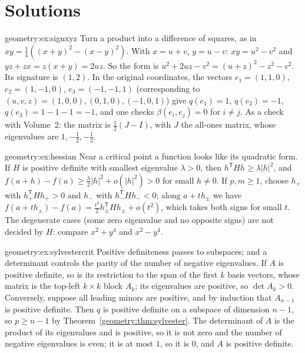 \section{Solutions}

\begin{solution}{geometry:ex:signxyz}
\idea Turn a product into a difference of squares, as in $xy=\frac14((x+y)^2-(x-y)^2)$.
\writeup With $x=u+v$, $y=u-v$: $xy=u^2-v^2$ and $yz+zx=z(x+y)=2uz$. So the form is $u^2+2uz-v^2=(u+z)^2-z^2-v^2$. Its signature is $(1,2)$. In the
original coordinates, the vectors $e_1=(1,1,0)$, $e_2=(1,-1,0)$, $e_3=(-1,-1,1)$ (corresponding to $(u,v,z)=(1,0,0),(0,1,0),(-1,0,1)$) give
$q(e_1)=1$, $q(e_2)=-1$, $q(e_3)=1-1-1=-1$, and one checks $\beta(e_i,e_j)=0$ for $i\ne j$. As a check with Volume~2: the matrix is
$\frac12(J-I)$, with $J$ the all-ones matrix, whose eigenvalues are $1,-\frac12,-\frac12$.
\end{solution}

\begin{solution}{geometry:ex:hessian}
\idea Near a critical point a function looks like its quadratic form.
\writeup If $H$ is positive definite with smallest eigenvalue $\lambda>0$, then $h^{\mathsf T}Hh\ge\lambda|h|^2$, and
$f(a+h)-f(a)\ge\frac\lambda2|h|^2+o(|h|^2)>0$ for small $h\ne0$. If $p,m\ge1$, choose $h_+$ with $h_+^{\mathsf T}Hh_+>0$ and $h_-$ with
$h_-^{\mathsf T}Hh_-<0$; along $a+th_\pm$ we have $f(a+th_\pm)-f(a)=\frac{t^2}2h_\pm^{\mathsf T}Hh_\pm+o(t^2)$, which takes both signs for small $t$.
The degenerate cases (some zero eigenvalue and no opposite signs) are not decided by $H$: compare $x^2+y^4$ and $x^2-y^4$.
\end{solution}

\begin{solution}{geometry:ex:sylvestercrit}
\idea Positive definiteness passes to subspaces; and a determinant controls the parity of the number of negative eigenvalues.
\writeup If $A$ is positive definite, so is its restriction to the span of the first $k$ basis vectors, whose matrix is the top-left $k\times k$
block $A_k$; its eigenvalues are positive, so $\det A_k>0$. Conversely, suppose all leading minors are positive, and by induction that $A_{n-1}$ is
positive definite. Then $q$ is positive definite on a subspace of dimension $n-1$, so $p\ge n-1$ by Theorem~\ref{geometry:thm:sylvester}. The determinant of $A$
is the product of its eigenvalues and is positive, so it is not zero and the number of negative eigenvalues is even; it is at most $1$, so it is $0$,
and $A$ is positive definite.
\end{solution}

